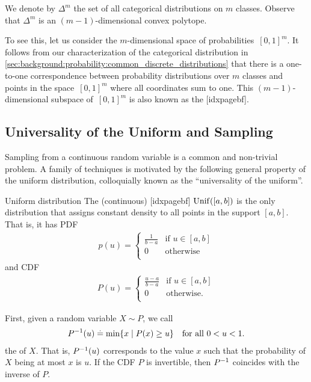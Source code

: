 We denote by $\Delta^m$ the set of all categorical distributions on $m$ classes. Observe that $\Delta^m$ is an ${(m-1)}$-dimensional convex polytope.

To see this, let us consider the $m$-dimensional space of probabilities~$[0,1]^m$.
It follows from our characterization of the categorical distribution in \cref{sec:background:probability:common_discrete_distributions} that there is a one-to-one correspondence between probability distributions over $m$ classes and points in the space~$[0,1]^m$ where all coordinates sum to one.
This $(m-1)$-dimensional subspace of~$[0,1]^m$ is also known as the [idxpagebf].

\subsection{Universality of the Uniform and Sampling}\label{sec:inverse_transform_sampling}

Sampling from a continuous random variable is a common and non-trivial problem.
A family of techniques is motivated by the following general property of the uniform distribution, colloquially known as the ``universality of the uniform''.

\begin{marginbox}{Uniform distribution}
  The (continuous) [idxpagebf] $\Unif{[a,b]}$ is the only distribution that assigns constant density to all points in the support $[a,b]$. That is, it has PDF \begin{align*}
    p(u) = \begin{cases}
      \frac{1}{b - a} & \text{if $u \in [a,b]$} \\
      0 & \text{otherwise} \\
    \end{cases}
  \end{align*} and CDF \begin{align*}
    P(u) = \begin{cases}
      \frac{u - a}{b - a} & \text{if $u \in [a,b]$} \\
      0 & \text{otherwise}. \\
    \end{cases}
  \end{align*}
\end{marginbox}

First, given a random variable $X \sim P$, we call \begin{align}
  P^{-1}(u) \overset{.}{=} \min\{x \mid P(x) \geq u\} \quad\text{for all $0 < u < 1$}.
\end{align} the  of $X$.
That is, $P^{-1}(u)$ corresponds to the value $x$ such that the probability of $X$ being at most $x$ is $u$.
If the CDF $P$ is invertible, then $P^{-1}$ coincides with the inverse of $P$.

